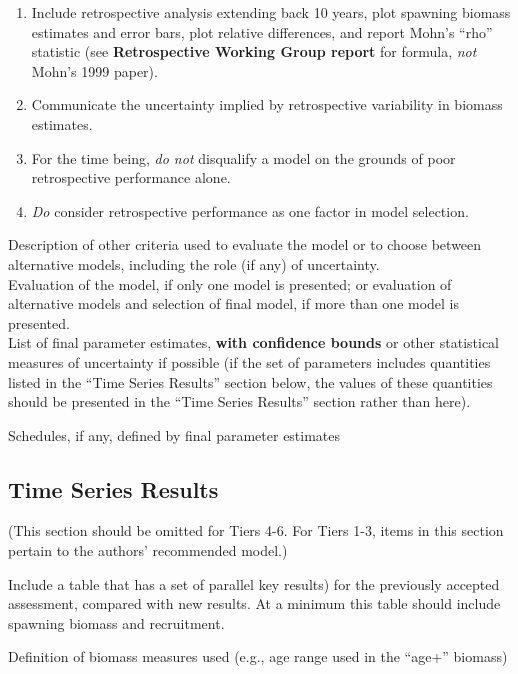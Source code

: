 \documentclass[
  11pt,
]{article}
\providecommand{\tightlist}{%
  \setlength{\itemsep}{0pt}\setlength{\parskip}{0pt}}
\begin{document}
\begin{enumerate}
\def\labelenumi{\arabic{enumi}.}
\tightlist
\item
  Include retrospective analysis extending back 10 years, plot spawning biomass estimates and error bars, plot relative differences, and report Mohn's ``rho'' statistic (see \textbf{Retrospective Working Group report} for formula, \emph{not} Mohn's 1999 paper).
\item
  Communicate the uncertainty implied by retrospective variability in biomass estimates.
\item
  For the time being, \emph{do not} disqualify a model on the grounds of poor retrospective performance alone.
\item
  \emph{Do} consider retrospective performance as one factor in model selection.
\end{enumerate}

Description of other criteria used to evaluate the model or to choose between alternative models, including the role (if any) of uncertainty.\\
Evaluation of the model, if only one model is presented; or evaluation of alternative models and selection of final model, if more than one model is presented.\\
List of final parameter estimates, \textbf{with confidence bounds} or other statistical measures of uncertainty if possible (if the set of parameters includes quantities listed in the ``Time Series Results'' section below, the values of these quantities should be presented in the ``Time Series Results'' section rather than here).

Schedules, if any, defined by final parameter estimates

\hypertarget{time-series-results}{%
\subsection{Time Series Results}\label{time-series-results}}

(This section should be omitted for Tiers 4-6.
For Tiers 1-3, items in this section pertain to the authors' recommended model.)

Include a table that has a set of parallel key results) for the previously accepted assessment, compared with new results. At a minimum this table should include spawning biomass and recruitment.

Definition of biomass measures used (e.g., age range used in the ``age+'' biomass)
\end{document}
